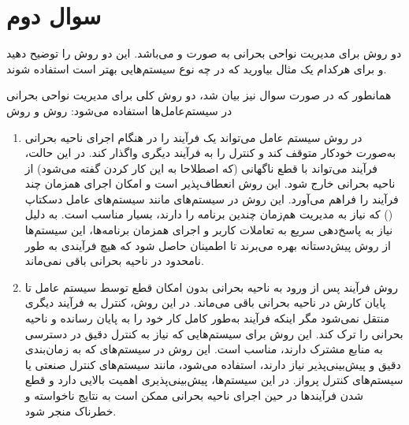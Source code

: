 \section{سوال دوم}

دو روش برای مدیریت نواحی بحرانی به صورت  و  می‌باشد. این دو روش را توضیح دهید و برای هرکدام یک مثال بیاورید که در چه نوع سیستم‌هایی بهتر است استفاده شوند.




\begin{qsolve}
	همانطور که در صورت سوال نیز بیان شد، دو روش کلی برای مدیریت نواحی بحرانی در سیستم‌عامل‌ها استفاده می‌شود: روش  و روش 
	
	\begin{enumerate}
		\item 
		در روش  سیستم عامل می‌تواند یک فرآیند را در هنگام اجرای ناحیه بحرانی به‌صورت خودکار متوقف کند و کنترل را به فرآیند دیگری واگذار کند. در این حالت، فرآیند می‌تواند با قطع ناگهانی (که اصطلاحا به این کار  کردن گفته می‌شود) از ناحیه بحرانی خارج شود. این روش انعطاف‌پذیر است و امکان اجرای همزمان چند فرآیند را فراهم می‌آورد. این روش در سیستم‌های  مانند سیستم‌های عامل دسکتاپ () که نیاز به مدیریت هم‌زمان چندین برنامه را دارند، بسیار مناسب است. به دلیل نیاز به پاسخ‌دهی سریع به تعاملات کاربر و اجرای همزمان برنامه‌ها، این سیستم‌ها از روش پیش‌دستانه بهره می‌برند تا اطمینان حاصل شود که هیچ فرآیندی به طور نامحدود در ناحیه بحرانی باقی نمی‌ماند.
		
		
		
		\item 
		روش   فرآیند پس از ورود به ناحیه بحرانی بدون امکان قطع توسط سیستم عامل تا پایان کارش در ناحیه بحرانی باقی می‌ماند. در این روش، کنترل به فرآیند دیگری منتقل نمی‌شود مگر اینکه فرآیند به‌طور کامل کار خود را به پایان رسانده و ناحیه بحرانی را ترک کند. این روش برای سیستم‌هایی که نیاز به کنترل دقیق در دسترسی به منابع مشترک دارند، مناسب است. این روش در سیستم‌های  که به زمان‌بندی دقیق و پیش‌بینی‌پذیر نیاز دارند، استفاده می‌شود، مانند سیستم‌های کنترل صنعتی یا سیستم‌های کنترل پرواز. در این سیستم‌ها، پیش‌بینی‌پذیری اهمیت بالایی دارد و قطع شدن فرآیندها در حین اجرای ناحیه بحرانی ممکن است به نتایج ناخواسته و خطرناک منجر شود.
	\end{enumerate}
\end{qsolve}